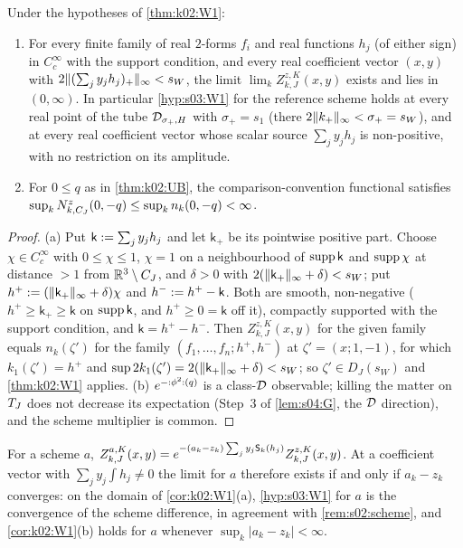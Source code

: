 \begin{corollary}\label{cor:k02:W1}
Under the hypotheses of \cref{thm:k02:W1}:
\begin{enumerate}[label=\textup{(\alph*)},leftmargin=*]
\item For every finite family of real $2$-forms $f_i$ and real functions $h_j$ (of either sign) in $C^\infty_c$ with the support condition, and every real coefficient vector $(x,y)$ with $2\lVert (\sum_jy_jh_j)_+\rVert_\infty<s_W$, the limit $\lim_kZ^{z,K}_{k,J}(x,y)$ exists and lies in $(0,\infty)$. In particular \cref{hyp:s03:W1} for the reference scheme holds at every real point of the tube $\mathcal D_{\sigma_+,H}$ with $\sigma_+=s_1$ (there $2\lVert k_+\rVert_\infty<\sigma_+=s_W$), and at every real coefficient vector whose scalar source $\sum_jy_jh_j$ is non-positive, with no restriction on its amplitude.
\item For $0\le q$ as in \cref{thm:k02:UB}, the comparison-convention functional satisfies $\sup_kN^z_{k,C_J}(0,-q)\le\sup_kn_k(0,-q)<\infty$.
\end{enumerate}
\end{corollary}
\begin{proof}
(a) Put $\mathsf k:=\sum_jy_jh_j$ and let $\mathsf k_+$ be its pointwise positive part. Choose $\chi\in C^\infty_c$ with $0\le\chi\le1$, $\chi=1$ on a neighbourhood of $\operatorname{supp}\mathsf k$ and $\operatorname{supp}\chi$ at distance $>1$ from $\mathbb R^3\setminus C_J$, and $\delta>0$ with $2(\lVert \mathsf k_+\rVert_\infty+\delta)<s_W$; put $h^+:=(\lVert \mathsf k_+\rVert_\infty+\delta)\chi$ and $h^-:= h^+-\mathsf k$. Both are smooth, non-negative ($h^+\ge\mathsf k_+\ge\mathsf k$ on $\operatorname{supp}\mathsf k$, and $h^+\ge0=\mathsf k$ off it), compactly supported with the support condition, and $\mathsf k=h^+-h^-$. Then $Z^{z,K}_{k,J}(x,y)$ for the given family equals $n_k(\zeta')$ for the family $(f_1,\dots,f_n;h^+,h^-)$ at $\zeta'=(x;1,-1)$, for which $k_1(\zeta')=h^+$ and $\sup2k_1(\zeta')=2(\lVert \mathsf k_+\rVert_\infty+\delta)<s_W$; so $\zeta'\in D_J(s_W)$ and \cref{thm:k02:W1} applies. (b) $e^{-{:}\phi^2{:}(q)}$ is a class-$\mathcal D$ observable; killing the matter on $T_J$ does not decrease its expectation (Step~3 of \cref{lem:s04:G}, the $\mathcal D$ direction), and the scheme multiplier is common.
\end{proof}

\begin{remark}\label{rem:k02:scheme}
For a scheme $a$, $Z^{a,K}_{k,J}(x,y)=e^{-(a_k-z_k)\sum_jy_j\mathsf S_k(h_j)}Z^{z,K}_{k,J}(x,y)$. At a coefficient vector with $\sum_jy_j\int h_j\ne0$ the limit for $a$ therefore exists if and only if $a_k-z_k$ converges: on the domain of \cref{cor:k02:W1}(a), \cref{hyp:s03:W1} for $a$ is the convergence of the scheme difference, in agreement with \cref{rem:s02:scheme}, and \cref{cor:k02:W1}(b) holds for $a$ whenever $\sup_k|a_k-z_k|<\infty$.
\end{remark}

